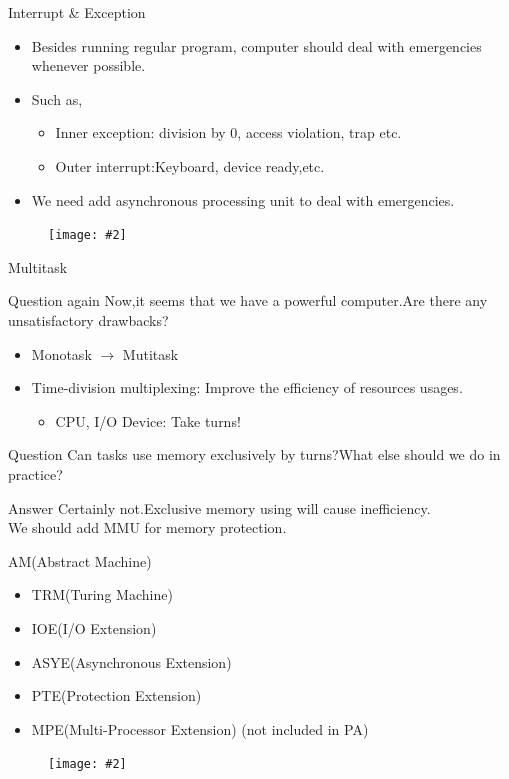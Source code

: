 \documentclass{beamer}
\newcommand{\fignocaption}[2]{
	\begin{figure}[htp]
		\centering
		\texttt{[image: \#2]}
	\end{figure}
}
\begin{document}
\begin{frame}{Interrupt \& Exception}
	\begin{itemize}
		\item Besides running regular program, computer should deal with emergencies whenever possible.
		\item Such as,
		\begin{itemize}
			\item Inner exception: division by 0, access violation, trap etc.
			\item Outer interrupt:Keyboard, device ready,etc.
		\end{itemize}
		\item	\alert{We need add asynchronous processing unit to deal with emergencies.}
	\end{itemize}
	\fignocaption{scale=0.4}{interrupt.png}
\end{frame}

\begin{frame}{Multitask}
\begin{block}{Question again}
	Now,it seems that we have a powerful computer.Are there any unsatisfactory drawbacks?
\end{block}
\pause
\begin{itemize}
	\item Monotask $\longrightarrow$ Mutitask
	\item \alert{Time-division multiplexing}: Improve the efficiency of resources usages.
	\begin{itemize}
		\item CPU, I/O Device: Take turns!
	\end{itemize}
\end{itemize}
\begin{block}{Question}
	Can tasks use memory exclusively by turns?What else should we do in practice?
\end{block}
\pause
\begin{alertblock}{Answer}
	Certainly not.Exclusive memory using will cause inefficiency.\\
\alert{We should add MMU for memory protection}.
\end{alertblock}

\end{frame}

\begin{frame}{AM(Abstract Machine)}
\begin{itemize}
	\item TRM(Turing Machine)
	\item IOE(I/O Extension)
	\item ASYE(Asynchronous Extension)
	\item PTE(Protection Extension)
	\item MPE(Multi-Processor Extension) (not included in PA)
\end{itemize}
\fignocaption{scale=0.4}{am.png}
\end{frame}
\end{document}
